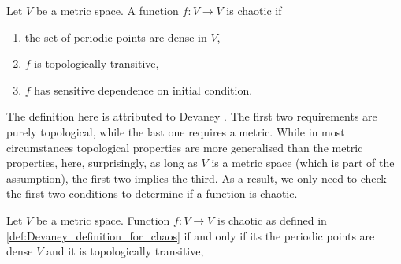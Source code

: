 \begin{defn}\label{def:Devaney_definition_for_chaos}
	Let $V$ be a metric space.
	A function $f: V \rightarrow V$ is chaotic if 
	\begin{enumerate}
		\item the set of periodic points are dense in $V$,
		\item $f$ is topologically transitive,
		\item $f$ has sensitive dependence on initial condition. 
	\end{enumerate}
	
\end{defn}


The definition here is attributed to Devaney \cite{Devaney_green_book_chaos_definition}. 
The first two requirements are purely topological, while the last one requires a metric. 
While in most circumstances topological properties are more generalised than the metric properties, here, surprisingly, as long as $V$ is a metric space (which is part of the assumption), the first two implies the third\cite{Banks}. 
As a result, we only need to check the first two conditions to determine if a function is chaotic.

\begin{thm}
	Let $V$ be a metric space. 
	Function $f: V \rightarrow V$ is chaotic as defined in \ref{def:Devaney_definition_for_chaos}
	if and only if its the periodic points are dense $V$ and it is topologically transitive,
\end{thm}


